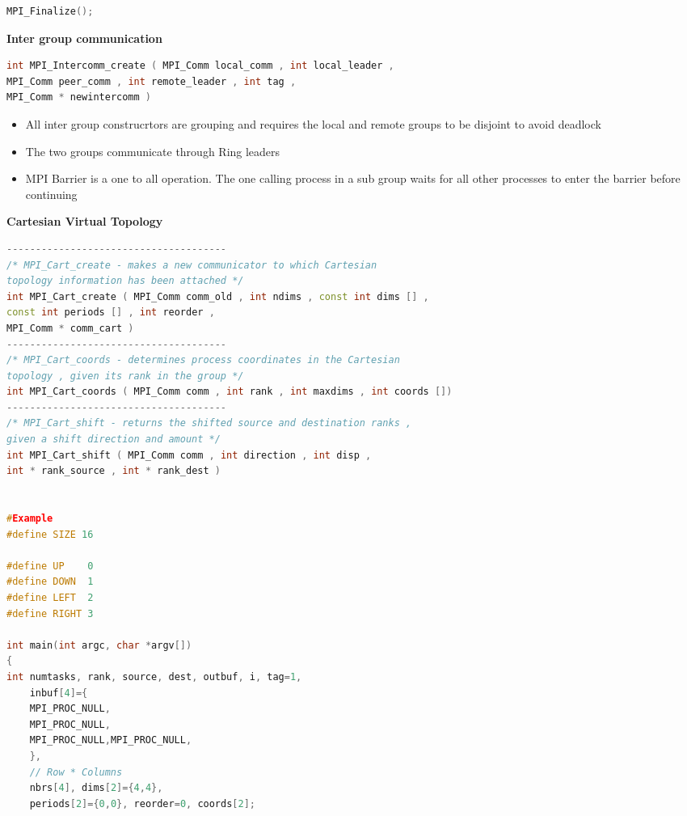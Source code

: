 \documentclass[10pt, landscape]{article}
\begin{document}
\begin{multicols}{4}
\begin{lstlisting}[language=C++, breaklines=true, breakatwhitespace=true]
MPI_Finalize();

        \end{lstlisting}

\textbf{Inter group communication}
\begin{lstlisting}[language=C++, breaklines=true, breakatwhitespace=true]
int MPI_Intercomm_create ( MPI_Comm local_comm , int local_leader ,
MPI_Comm peer_comm , int remote_leader , int tag ,
MPI_Comm * newintercomm )
\end{lstlisting}

\begin{itemize}
    \item All inter group construcrtors are grouping and requires the local and remote groups to be disjoint to avoid deadlock 
    \item The two groups communicate through Ring leaders 
    \item MPI Barrier is a one to all operation. The one calling process in a sub group waits for all other processes to enter the barrier before continuing
\end{itemize}

\textbf{Cartesian Virtual Topology}
\begin{lstlisting}[language=C++, breaklines=true, breakatwhitespace=true]
--------------------------------------
/* MPI_Cart_create - makes a new communicator to which Cartesian
topology information has been attached */
int MPI_Cart_create ( MPI_Comm comm_old , int ndims , const int dims [] ,
const int periods [] , int reorder ,
MPI_Comm * comm_cart )
--------------------------------------
/* MPI_Cart_coords - determines process coordinates in the Cartesian
topology , given its rank in the group */
int MPI_Cart_coords ( MPI_Comm comm , int rank , int maxdims , int coords [])
--------------------------------------
/* MPI_Cart_shift - returns the shifted source and destination ranks ,
given a shift direction and amount */
int MPI_Cart_shift ( MPI_Comm comm , int direction , int disp ,
int * rank_source , int * rank_dest )


#Example
#define SIZE 16

#define UP    0
#define DOWN  1
#define LEFT  2
#define RIGHT 3

int main(int argc, char *argv[])
{
int numtasks, rank, source, dest, outbuf, i, tag=1, 
    inbuf[4]={
    MPI_PROC_NULL,
    MPI_PROC_NULL,
    MPI_PROC_NULL,MPI_PROC_NULL,
    }, 
    // Row * Columns
    nbrs[4], dims[2]={4,4}, 
    periods[2]={0,0}, reorder=0, coords[2];


\end{lstlisting}
\end{multicols}
\end{document}
